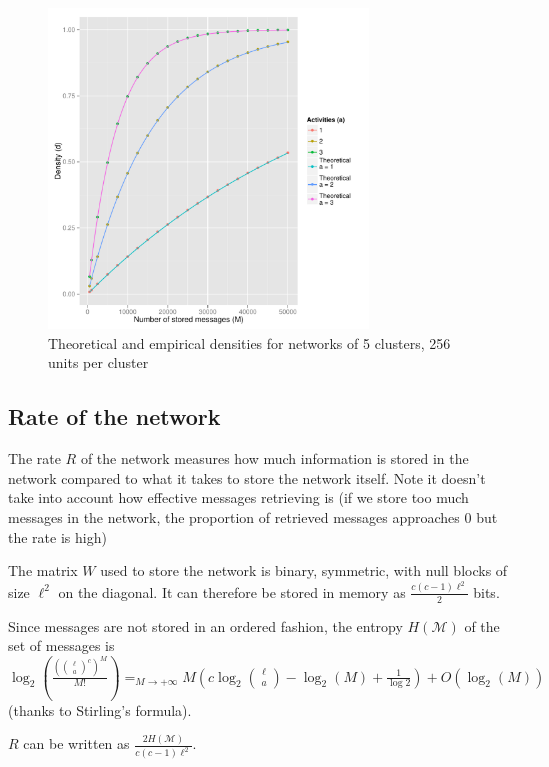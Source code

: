 \documentclass[english,10pt,twocolumn]{IEEEtran}
\theoremstyle{definition}
\begin{document}
	\begin{figure}[!htb]
		\includegraphics[width=8.5cm]{Courbes/c5l256densities}%
		\caption{Theoretical and empirical densities for networks of 5 clusters, 256 units per cluster }
			\label{densiteth}
	\end{figure}	
	
	

	\subsection{Rate of the network}	
	
	The rate $R$ of the network measures how much information is stored in the network compared to what it takes to store the network itself. Note it doesn't take into account how effective messages retrieving is (if we store too much messages in the network, the proportion of retrieved messages approaches $0$ but the rate is high)
	
	
		The matrix $W$ used to store the network is binary, symmetric, with null blocks of size $\ell^2$ on the diagonal. It can therefore be stored in memory as $\frac{c(c-1) \ell^2}{2}$ bits. 
		
		Since messages are not stored in an ordered fashion, the entropy $H(\mathcal{M})$ of the set of messages is $\log_2(\frac{({\ell \choose a}^c)^M}{M!}) \mathop{=}_{M \rightarrow +\infty} M(c \log_2{\ell \choose a } - \log_2(M) + \frac{1}{\log 2}) + O(\log_2(M)) $ (thanks to  Stirling's formula).%
		
		$R$ can be written as $\frac{2H(\mathcal{M})}{c(c-1) \ell^2}$.
		
\end{document}
